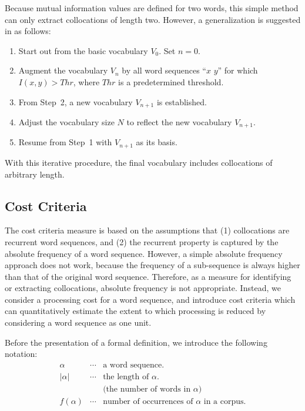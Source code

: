 Because mutual information values are defined for two words,
this simple method can only extract collocations of length two.
However, a generalization is suggested in \cite{Jelinek90} as follows:
\begin{enumerate}
\item   Start out from the basic vocabulary $V_{0}$. Set $n = 0$.
\item   Augment the vocabulary $V_{n}$ by all word sequences ``$x$ $y$''
        for which $I(x,y) > Thr$, where $Thr$ is a predetermined threshold.
\item   From Step~2, a new vocabulary $V_{n+1}$ is established.
\item   Adjust the vocabulary size $N$ to reflect the new vocabulary $V_{n+1}$.
\item   Resume from Step~1 with $V_{n+1}$ as its basis.
\end{enumerate}
With this iterative procedure, the final vocabulary includes
collocations of arbitrary length.

\subsection{Cost Criteria}

The cost criteria measure is based on the assumptions that
(1) collocations are recurrent word sequences,
and (2) the recurrent property is captured by
the absolute frequency of a word sequence.
However, a simple absolute frequency approach does not work,
because the frequency of a sub-sequence is always higher
than that of the original word sequence.
Therefore, as a measure for identifying or extracting collocations,
absolute frequency is not appropriate.
Instead, we consider a processing cost for a word sequence,
and introduce cost criteria 
which can quantitatively estimate
the extent to which processing is reduced
by considering a word sequence as one unit.

Before the presentation of a formal definition,
we introduce the following notation:
\begin{eqnarray}
        \alpha    & \cdots & \mbox{a word sequence.}\\
        |\alpha|  & \cdots & \mbox{the length of $\alpha$.}\\
                  &        & \mbox{(the number of words in $\alpha$)} \nonumber \\
        f(\alpha) & \cdots & \mbox{number of occurrences of $\alpha$ in a corpus.}
\end{eqnarray}

